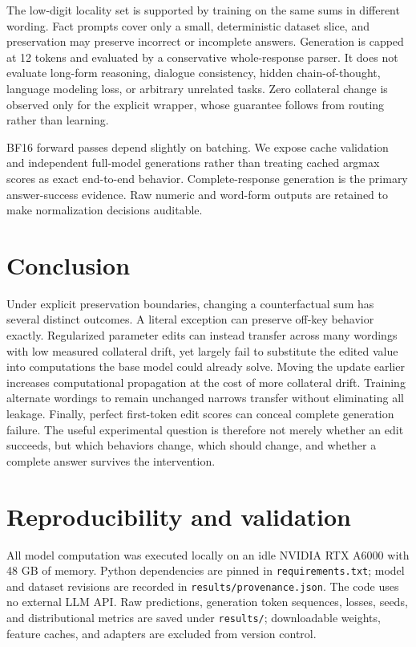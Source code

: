 \documentclass[10pt,twocolumn]{article}
\begin{document}
The low-digit locality set is supported by training on the same sums in different wording. Fact prompts cover only a small, deterministic dataset slice, and preservation may preserve incorrect or incomplete answers. Generation is capped at 12 tokens and evaluated by a conservative whole-response parser. It does not evaluate long-form reasoning, dialogue consistency, hidden chain-of-thought, language modeling loss, or arbitrary unrelated tasks. Zero collateral change is observed only for the explicit wrapper, whose guarantee follows from routing rather than learning.

BF16 forward passes depend slightly on batching. We expose cache validation and independent full-model generations rather than treating cached argmax scores as exact end-to-end behavior. Complete-response generation is the primary answer-success evidence. Raw numeric and word-form outputs are retained to make normalization decisions auditable.

\section{Conclusion}
Under explicit preservation boundaries, changing a counterfactual sum has several distinct outcomes. A literal exception can preserve off-key behavior exactly. Regularized parameter edits can instead transfer across many wordings with low measured collateral drift, yet largely fail to substitute the edited value into computations the base model could already solve. Moving the update earlier increases computational propagation at the cost of more collateral drift. Training alternate wordings to remain unchanged narrows transfer without eliminating all leakage. Finally, perfect first-token edit scores can conceal complete generation failure. The useful experimental question is therefore not merely whether an edit succeeds, but which behaviors change, which should change, and whether a complete answer survives the intervention.




\appendix
\section{Reproducibility and validation}\label{app:validation}
All model computation was executed locally on an idle NVIDIA RTX A6000 with 48 GB of memory. Python dependencies are pinned in \texttt{requirements.txt}; model and dataset revisions are recorded in \texttt{results/provenance.json}. The code uses no external LLM API. Raw predictions, generation token sequences, losses, seeds, and distributional metrics are saved under \texttt{results/}; downloadable weights, feature caches, and adapters are excluded from version control.
\end{document}

